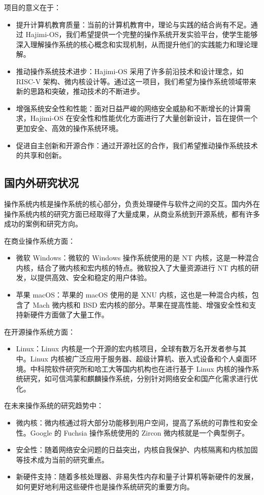 \documentclass[UTF8]{article}
\begin{document}
项目的意义在于：
\begin{itemize}
  \item 提升计算机教育质量：当前的计算机教育中，理论与实践的结合尚有不足。通过 Hajimi-OS，我们希望提供一个完整的操作系统开发实验平台，使学生能够深入理解操作系统的核心概念和实现机制，从而提升他们的实践能力和理论理解。
  \item 推动操作系统技术进步：Hajimi-OS 采用了许多前沿技术和设计理念，如 RISC-V 架构、微内核设计等。通过这一项目，我们希望为操作系统领域带来新的思路和突破，推动技术的不断进步。
  \item 增强系统安全性和性能：面对日益严峻的网络安全威胁和不断增长的计算需求，Hajimi-OS 在安全性和性能优化方面进行了大量创新设计，旨在提供一个更加安全、高效的操作系统环境。
  \item 促进自主创新和开源合作：通过开源社区的合作，我们希望推动操作系统技术的共享和创新。
\end{itemize}

\subsection{国内外研究状况}
操作系统内核是操作系统的核心部分，负责处理硬件与软件之间的交互。国内外在操作系统内核的研究方面已经取得了大量成果，从商业系统到开源系统，都有许多成功的案例和研究方向。

在商业操作系统方面：
\begin{itemize}
  \item 微软 Windows：微软的 Windows 操作系统使用的是 NT 内核，这是一种混合内核，结合了微内核和宏内核的特点。微软投入了大量资源进行 NT 内核的研发，以提供高效、安全和稳定的用户体验。
  \item 苹果 macOS：苹果的 macOS 使用的是 XNU 内核，这也是一种混合内核，包含了 Mach 微内核和 BSD 宏内核的部分。苹果在提高性能、增强安全性和支持新硬件方面做了大量工作。
\end{itemize}

在开源操作系统方面：
\begin{itemize}
  \item Linux：Linux 内核是一个开源的宏内核项目，全球有数万名开发者参与其中。Linux 内核被广泛应用于服务器、超级计算机、嵌入式设备和个人桌面环境。中科院软件研究所和哈工大等国内机构也在进行基于 Linux 内核的操作系统研究，如可信鸿蒙和麒麟操作系统，分别针对网络安全和国产化需求进行优化。
\end{itemize}

在未来操作系统的研究趋势中：
\begin{itemize}
  \item 微内核：微内核通过将大部分功能移到用户空间，提高了系统的可靠性和安全性。Google 的 Fuchsia 操作系统使用的 Zircon 微内核就是一个典型例子。
  \item 安全性：随着网络安全问题的日益突出，内核自我保护、内核隔离和内核加固等技术成为当前的研究重点。
  \item 新硬件支持：随着多核处理器、非易失性内存和量子计算机等新硬件的发展，如何更好地利用这些硬件也是操作系统研究的重要方向。
\end{itemize}
\end{document}
